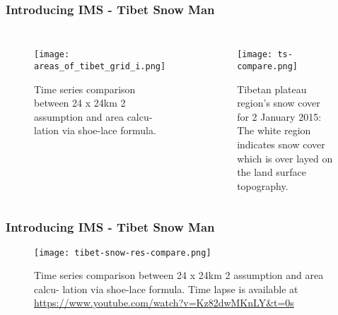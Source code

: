 \begin{frame}
\frametitle{Introducing IMS - Tibet Snow Man}
\begin{columns}
\begin{figure}
\vspace*{-1.25cm}
    \centering
    \begin{minipage}{.85\columnwidth}
    \texttt{[image: areas\_of\_tibet\_grid\_i.png]}
    \caption{\tiny{Time series comparison between 24 x 24km 2 assumption and area calcu-
lation via shoe-lace formula.}}
    \end{minipage}
\end{figure}

\begin{figure}
    \centering
    \begin{minipage}{.95\columnwidth}
    \texttt{[image: ts-compare.png]}
    \caption{\tiny{Tibetan plateau region’s snow cover for 2 January 2015: The white region
indicates snow cover which is over layed on the land surface topography.}}
    \end{minipage}
\end{figure}
\end{columns}
\end{frame}

\begin{frame}
\frametitle{Introducing IMS - Tibet Snow Man}
\begin{figure}
    \centering
    \begin{minipage}{.9\columnwidth}
    \texttt{[image: tibet-snow-res-compare.png]}
    \caption{\tiny{Time series comparison between 24 x 24km 2 assumption and area calcu-
lation via shoe-lace formula. Time lapse is available at \url{https://www.youtube.com/watch?v=Kz82dwMKnLY&t=0s}}}
    \end{minipage}
\end{figure}
\end{frame}

